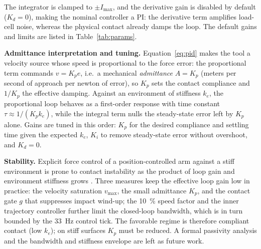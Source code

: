 \documentclass[conference]{IEEEtran}
\begin{document}
The integrator is clamped to $\pm I_{\max}$, and the derivative gain is disabled
by default ($K_d=0$), making the nominal controller a PI: the derivative term
amplifies load-cell noise, whereas the physical contact already damps the loop.
The default gains and limits are listed in Table~\ref{tab:params}.

\textbf{Admittance interpretation and tuning.} Equation~\eqref{eq:pid} makes the
tool a velocity source whose speed is proportional to the force error: the
proportional term commands $v=K_p e$, i.e.\ a mechanical \emph{admittance}
$A=K_p$ (meters per second of approach per newton of error), so $K_p$ sets the
contact compliance and $1/K_p$ the effective damping. Against an environment of
stiffness $k_e$, the proportional loop behaves as a first-order response with time
constant $\tau\approx 1/(K_p k_e)$, while the integral term nulls the steady-state
error left by $K_p$ alone. Gains are tuned in this order: $K_p$ for the desired
compliance and settling time given the expected $k_e$, $K_i$ to remove
steady-state error without overshoot, and $K_d=0$.

\textbf{Stability.} Explicit force control of a position-controlled arm against a
stiff environment is prone to contact instability as the product of loop gain and
environment stiffness grows \cite{siciliano2009,villani2016}. Three measures keep
the effective loop gain low in practice: the velocity saturation $v_{\max}$, the
small admittance $K_p$, and the contact gate $g$ that suppresses impact wind-up;
the \SI{10}{\percent} speed factor and the inner trajectory controller further
limit the closed-loop bandwidth, which is in turn bounded by the \SI{33}{\hertz}
control tick. The favorable regime is therefore compliant contact (low $k_e$); on
stiff surfaces $K_p$ must be reduced. A formal passivity analysis and the
bandwidth and stiffness envelope are left as future work.
\end{document}

